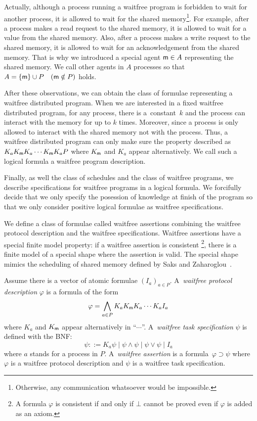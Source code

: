   Actually, although a process running a waitfree program is forbidden to wait for another process,
  it is allowed to wait for the shared memory\footnote{Otherwise, any communication
  whatsoever would be impossible.}.
  For example, after a process
  makes a read request to the shared memory,
  it is allowed to wait for a value from the shared memory.
  Also, after a process makes a write request to the shared memory,
  it is allowed to wait for an acknowledgement from the shared memory.
  That is why we introduced a special agent ${\sf m}\in A$ representing the shared memory.
  We call other agents in $A$ processes so that
  $A=\{{\sf m}\}\cup P\quad ({\sf m}\notin P)$ holds.

  After these observations, we can obtain the class of
  formulae representing a waitfree distributed program.
  When we are interested in a fixed waitfree distributed program,
  for any process, there is a~constant~$k$ and the process can interact with the memory for
  up to $k$ times.
  Moreover, since a process is only allowed to interact with the shared memory not with the
  process.
  Thus, a waitfree distributed program can only make sure the property described as
  $K_aK_{\sf m} K_a\cdots K_{\sf m} K_a P$ where $K_{\sf m}$ and $K_a$ appear
  alternatively.
  We call such a logical formula a waitfree program description.

  Finally, as well the class of schedules and the class of waitfree programs,
  we describe specifications for waitfree programs in a logical formula.
  We forcifully decide that we only specify the posession of knowledge at finish of the
  program so that we only consider positive logical formulae as waitfree specifications.

  We define a class of formulae called waitfree assertions combining the waitfree protocol
  description and the waitfree specifications.
  Waitfree assertions have a special finite model property:
  if a waitfree assertion is consistent%
  \footnote{A formula $\varphi$ is consistent if and only if $\bot$ cannot be proved even if
  $\varphi$ is added as an axiom.}, there is a finite model of a special shape
  where the assertion is valid.
  The special shape mimics the scheduling of shared memory
  defined by Saks and Zaharoglou~\cite{saks2000wait}.

  \begin{definition}
   Assume there is a vector of atomic formulae $(I_a)_{a\in P}$.
   A~\textit{waitfree protocol description} $\varphi$ is a formula of the form
   \[
   \varphi = \bigwedge_{a\in P} K_a K_{\sf m} K_a \cdots K_a I_a
   \]
   where $K_a$ and $K_{\sf m}$ appear alternatively in ``$\cdots$''.
   A~\textit{waitfree task specification} $\psi$ is defined with the BNF:
   \[
   \psi ::= K_a\psi\mid \psi\land\psi\mid \psi\vee\psi\mid I_a
   \]
   where $a$ stands for a process in $P$.
   A~\textit{waitfree assertion} is a formula~$\varphi\supset\psi$ where $\varphi$ is a
   waitfree protocol description and $\psi$ is a waitfree task specification.
  \end{definition}

